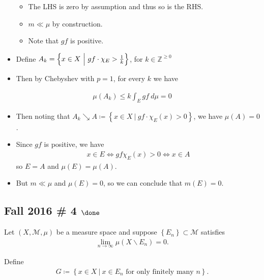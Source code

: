 \begin{solution}
\begin{itemize}
  \begin{itemize}
  \item
    The LHS is zero by assumption and thus so is the RHS.
  \item
    \(m \ll \mu\) by construction.
  \item
    Note that \(gf\) is positive.
  \end{itemize}
\item
  Define
  \(A_k = \left\{{x\in X {~\mathrel{\Big|}~}gf \cdot \chi_E > {1 \over k} }\right\}\),
  for \(k\in {\mathbb{Z}}^{\geq 0}\)
\item
  Then by Chebyshev with \(p=1\), for every \(k\) we have
\end{itemize}

\begin{align*}
\mu(A_k) \leq k \int_E gf ~d\mu = 0
\end{align*}

\begin{itemize}
\item
  Then noting that
  \(A_k \searrow A \coloneqq\left\{{x\in X {~\mathrel{\Big|}~}gf\cdot \chi_E(x) > 0}\right\}\),
  we have \(\mu(A) = 0\).
\item
  Since \(gf\) is positive, we have
  \begin{align*}
  x\in E \iff gf\chi_E(x) > 0 \iff x\in A
  \end{align*}
  so \(E = A\) and \(\mu(E) = \mu(A)\).
\item
  But \(m \ll \mu\) and \(\mu(E) = 0\), so we can conclude that
  \(m(E) = 0\).
\end{itemize}

\end{solution}

\hypertarget{fall-2016-4-done}{%
\subsection{\texorpdfstring{Fall 2016 \# 4
\(\done\)}{Fall 2016 \# 4 \textbackslash done}}\label{fall-2016-4-done}}

Let \((X, \mathcal M, \mu)\) be a measure space and suppose
\(\left\{{E_n}\right\} \subset \mathcal M\) satisfies
\begin{align*}
\lim _{n \rightarrow \infty} \mu\left(X \backslash E_{n}\right)=0.
\end{align*}

Define
\begin{align*}
G \coloneqq\left\{{x\in X {~\mathrel{\Big|}~}x\in E_n \text{ for only finitely many  } n}\right\}.
\end{align*}

